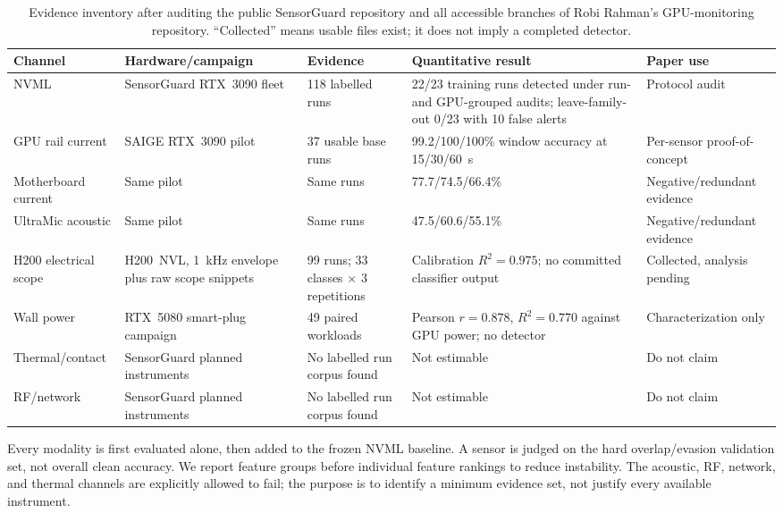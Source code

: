 \documentclass[sigplan,anonymous,review,nonacm]{acmart}
\begin{document}
\begin{table}[t]
\centering
\caption{Evidence inventory after auditing the public SensorGuard repository and all accessible branches of Robi Rahman's GPU-monitoring repository. ``Collected'' means usable files exist; it does not imply a completed detector.}
\label{tab:sensor-evidence}
\scriptsize
\begin{tabularx}{\textwidth}{p{2.1cm}p{2.4cm}p{1.8cm}Xp{2.3cm}}
\toprule
Channel & Hardware/campaign & Evidence & Quantitative result & Paper use \\
\midrule
NVML & SensorGuard RTX~3090 fleet & 118 labelled runs & 22/23 training runs detected under run- and GPU-grouped audits; leave-family-out 0/23 with 10 false alerts & Protocol audit \\
GPU rail current & SAIGE RTX~3090 pilot & 37 usable base runs & 99.2/100/100\% window accuracy at 15/30/60~s & Per-sensor proof-of-concept \\
Motherboard current & Same pilot & Same runs & 77.7/74.5/66.4\% & Negative/redundant evidence \\
UltraMic acoustic & Same pilot & Same runs & 47.5/60.6/55.1\% & Negative/redundant evidence \\
H200 electrical scope & H200~NVL, 1~kHz envelope plus raw scope snippets & 99 runs; 33 classes $\times$ 3 repetitions & Calibration $R^2=0.975$; no committed classifier output & Collected, analysis pending \\
Wall power & RTX~5080 smart-plug campaign & 49 paired workloads & Pearson $r=0.878$, $R^2=0.770$ against GPU power; no detector & Characterization only \\
Thermal/contact & SensorGuard planned instruments & No labelled run corpus found & Not estimable & Do not claim \\
RF/network & SensorGuard planned instruments & No labelled run corpus found & Not estimable & Do not claim \\
\bottomrule
\end{tabularx}
\end{table}

Every modality is first evaluated alone, then added to the frozen NVML baseline. A sensor is judged on the hard overlap/evasion validation set, not overall clean accuracy. We report feature groups before individual feature rankings to reduce instability. The acoustic, RF, network, and thermal channels are explicitly allowed to fail; the purpose is to identify a minimum evidence set, not justify every available instrument.
\end{document}
